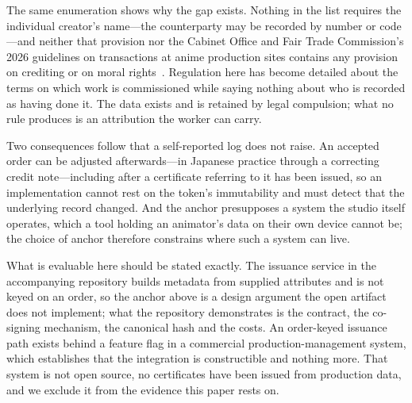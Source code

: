 The same enumeration shows why the gap exists. Nothing in the list requires the
individual creator's name---the counterparty may be recorded by number or code---and
neither that provision nor the Cabinet Office and Fair Trade Commission's 2026 guidelines
on transactions at anime production sites contains any provision on crediting or on moral
rights~\cite{meti2026animeguideline,jftc2026shishin}. Regulation here has become detailed
about the terms on which work is commissioned while saying nothing about who is recorded
as having done it. The data exists and is retained by legal compulsion; what no rule
produces is an attribution the worker can carry.

Two consequences follow that a self-reported log does not raise. An accepted order
can be adjusted afterwards---in Japanese practice through a correcting credit
note---including after a certificate referring to it has been issued, so an
implementation cannot rest on the token's immutability and must detect that the
underlying record changed. And the anchor presupposes a system the studio itself
operates, which a tool holding an animator's data on their own device cannot be;
the choice of anchor therefore constrains where such a system can live.

What is evaluable here should be stated exactly. The issuance service in the
accompanying repository builds metadata from supplied attributes and is not keyed on an
order, so the anchor above is a design argument the open artifact does not implement; what
the repository demonstrates is the contract, the co-signing mechanism, the canonical hash
and the costs. An order-keyed issuance path exists behind a feature flag in a commercial
production-management system, which establishes that the integration is constructible and
nothing more. That system is not open source, no certificates have been issued from
production data, and we exclude it from the evidence this paper rests on.
